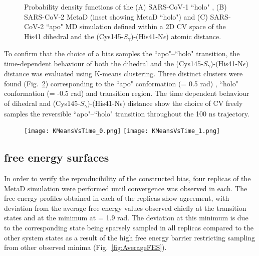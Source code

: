\begin{figure}[h!]
  \centering
  \begin{subfigure}
    \texttt{[image: HOLO\_2DPMF.png]}
  \end{subfigure}
  \begin{subfigure}
    \texttt{[image: MetaD\_2DPMF.png]}
  \end{subfigure}
    \begin{subfigure}
    \texttt{[image: APO\_2DPMF.png]}
  \end{subfigure}
  \caption{Probability density functions of the (A) SARS-CoV-1 ``holo" , (B) SARS-CoV-2 MetaD (inset showing MetaD ``holo") and (C) SARS-CoV-2 ``apo" MD simulation defined within a 2D CV space of the His41 \dihtwo dihedral and the (Cys145-$S_{\gamma}$)-(His41-N{$\epsilon$}) atomic distance.}
  \label{fig:2DPMF}
\end{figure}


To confirm that the choice of a \dihone bias samples the ``apo"--``holo" transition, the time-dependent behaviour of both the \dihtwo dihedral and the (Cys145-$S_{\gamma}$)-(His41-N{$\epsilon$}) distance was evaluated using K-means clustering.\cite{scikit-learn} Three distinct clusters were found (Fig.~\ref{fig:2DAveragePMF}) corresponding to the ``apo" conformation (\dihtwo = 0.5 rad) , ``holo" conformation (\dihtwo = -0.5 rad) and transition region. The time dependent behaviour of \dihtwo dihedral and (Cys145-$S_{\gamma}$)-(His41-N{$\epsilon$}) distance show the choice of CV freely samples the reversible ``apo"--``holo" transition throughout the 100 ns trajectory.\\

\begin{figure}[!h]
    \centering
    \texttt{[image: KMeansVsTime\_0.png]}
    \texttt{[image: KMeansVsTime\_1.png]}
    \caption{}
    \label{fig:2DAveragePMF}
\end{figure}

\subsection{\mpro free energy surfaces}

In order to verify the reproducibility of the constructed bias, four replicas of the MetaD simulation were performed until convergence was observed in each. The free energy profiles obtained in each of the replicas show agreement, with deviation from the average free energy values observed chiefly at the transition states and at the minimum at \dihone = 1.9 rad. The deviation at this minimum is due to the corresponding state being sparsely sampled in all replicas compared to the other system states as a result of the high free energy barrier restricting sampling from other observed minima (Fig.~\ref{fig:AverageFES}).\\

